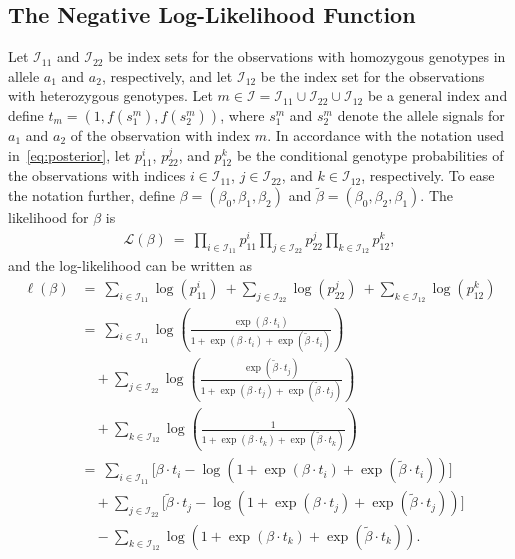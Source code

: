 \documentclass[preprint,5p,times,11pt]{elsarticle}
\begin{document}
\subsection*{The Negative Log-Likelihood Function}
Let $\mathcal{I}_{11}$ and $\mathcal{I}_{22}$ be index sets for the observations with homozygous genotypes in allele $a_1$ and $a_2$, respectively, and let $\mathcal{I}_{12}$ be the index set for the observations with heterozygous genotypes.
Let $m \in \mathcal{I} = \mathcal{I}_{11}\cup\mathcal{I}_{22}\cup\mathcal{I}_{12}$ be a general index and define $t_m = (1, f(s_1^m), f(s_2^m))$, where $s_1^m$ and $s_2^m$ denote the allele signals for $a_1$ and $a_2$ of the observation with index $m$.
In accordance with the notation used in~\eqref{eq:posterior}, let $p_{11}^i$, $p_{22}^j$, and $p_{12}^k$ be the conditional genotype probabilities of the observations with indices $i \in \mathcal{I}_{11}$, $j \in \mathcal{I}_{22}$, and $k \in \mathcal{I}_{12}$, respectively.
To ease the notation further, define $\beta = (\beta_0,\beta_1,\beta_2)$ and $\tilde\beta = (\beta_0,\beta_2,\beta_1)$.
The likelihood for $\beta$ is
\begin{align*}
\mathcal{L}\left(\beta\right) \ = \ \prod_{i\in\mathcal{I}_{11}} p_{11}^i \prod_{j\in\mathcal{I}_{22}} p_{22}^j \prod_{k\in\mathcal{I}_{12}} p_{12}^k,
\end{align*}
and the log-likelihood can be written as
\begin{align*}
\ell\left(\beta\right)
&=\ \sum_{i\in\mathcal{I}_{11}} \log\left(p_{11}^i\right)
\ + \sum_{j\in\mathcal{I}_{22}} \log\left(p_{22}^j\right)
\ + \sum_{k\in\mathcal{I}_{12}} \log\left(p_{12}^k\right) \\
&= \ \sum_{i\in\mathcal{I}_{11}} \log\left(\frac{\exp\left(\beta \cdot t_i \right)}{1 + \exp\left(\beta \cdot t_i \right) + \exp\left(\tilde{\beta} \cdot t_i \right)}\right) \\
&\quad + \sum_{j\in\mathcal{I}_{22}} \log\left(\frac{\exp\left(\tilde{\beta} \cdot t_j \right)}{1 + \exp\left(\beta \cdot t_j \right) + \exp\left(\tilde{\beta} \cdot t_j \right)}\right) \\
&\quad + \sum_{k\in\mathcal{I}_{12}} \log\left(\frac{1}{1 + \exp\left(\beta \cdot t_k \right) + \exp\left(\tilde{\beta} \cdot t_k \right)}\right) \\
&= \ \sum_{i\in\mathcal{I}_{11}} \Bigg[ \beta \cdot t_i - \log\left(1 + \exp\left(\beta \cdot t_i \right) + \exp\left(\tilde{\beta} \cdot t_i \right)\right) \Bigg] \\
&\quad + \sum_{j\in\mathcal{I}_{22}} \Bigg[ \tilde{\beta} \cdot t_j - \log\left(1 + \exp\left(\beta \cdot t_j \right) + \exp\left(\tilde{\beta} \cdot t_j \right)\right) \Bigg] \\
&\quad - \sum_{k\in\mathcal{I}_{12}} \log\left(1 + \exp\left(\beta \cdot t_k \right) + \exp\left(\tilde{\beta} \cdot t_k \right)\right).
\end{align*}
\end{document}
